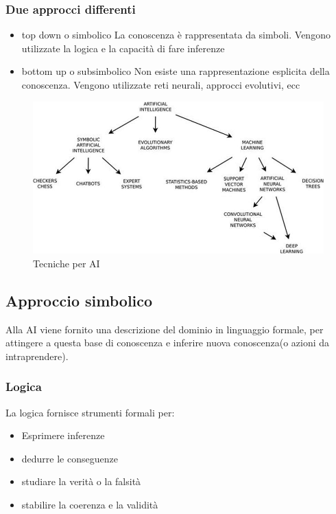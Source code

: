 \subsubsection{Due approcci differenti}
\begin{itemize}
    \item top down o simbolico
    La conoscenza è rappresentata da simboli. Vengono utilizzate la
    logica e la capacità di fare inferenze
    \item bottom up o subsimbolico
    Non esiste una rappresentazione esplicita della conoscenza.
    Vengono utilizzate reti neurali, approcci evolutivi, ecc
\end{itemize}

\begin{figure}[H]
    \centering
    \includegraphics[width=0.8\linewidth]{imgs/13 - ai}
    \caption{Tecniche per AI}
    \label{fig:ai_tecniche}
\end{figure}

\subsection{Approccio simbolico}
Alla AI viene fornito una descrizione del dominio in linguaggio formale, per attingere
a questa base di conoscenza e inferire nuova conoscenza(o azioni da intraprendere).

\subsubsection{Logica}
La logica fornisce strumenti formali per:
\begin{itemize}
    \item Esprimere inferenze
    \item dedurre le conseguenze
    \item studiare la verità o la falsità
    \item stabilire la coerenza e la validità
\end{itemize}


